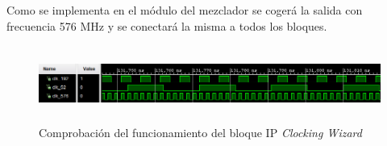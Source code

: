 \pagebreak

Como se implementa en el módulo del mezclador se cogerá la salida con frecuencia 576 MHz y se conectará la misma a todos los bloques.

\vspace{3mm}

\begin{figure}[h]
	\centering
	\includegraphics[width=1\textwidth, height=2.5cm]{img/simu/mmcm.PNG}
	\caption{Comprobación del funcionamiento del bloque IP \textit{Clocking Wizard}}
	\label{fig:mmcm2}
\end{figure}



